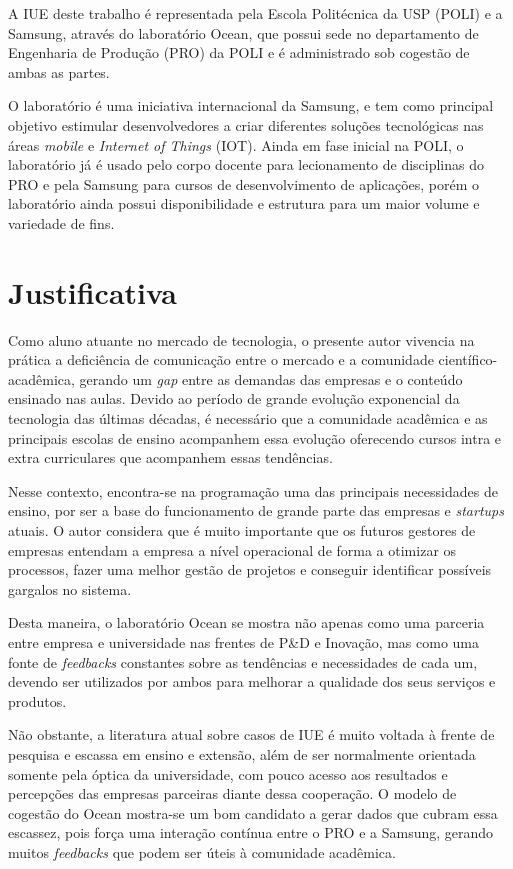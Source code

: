 A IUE deste trabalho é representada pela Escola Politécnica da USP (POLI) e a Samsung, através do laboratório Ocean, que possui sede no departamento de Engenharia de Produção (PRO) da POLI e é administrado sob cogestão de ambas as partes.

O laboratório é uma iniciativa internacional da Samsung, e tem como principal objetivo estimular desenvolvedores a criar diferentes soluções tecnológicas nas áreas \textit{mobile} e \textit{Internet of Things} (IOT). Ainda em fase inicial na POLI, o laboratório já é usado pelo corpo docente para lecionamento de disciplinas do PRO e pela Samsung para cursos de desenvolvimento de aplicações, porém o laboratório ainda possui disponibilidade e estrutura para um maior volume e variedade de fins.

\section{Justificativa}
\label{cha:justificativa}

Como aluno atuante no mercado de tecnologia, o presente autor vivencia na prática a deficiência de comunicação entre o mercado e a comunidade científico-acadêmica, gerando um \textit{gap} entre as demandas das empresas e o conteúdo ensinado nas aulas. Devido ao período de grande evolução exponencial da tecnologia das últimas décadas, é necessário que a comunidade acadêmica e as principais escolas de ensino acompanhem essa evolução oferecendo cursos intra e extra curriculares que acompanhem essas tendências.

Nesse contexto, encontra-se na programação uma das principais necessidades de ensino, por ser a base do funcionamento de grande parte das empresas e \textit{startups} atuais. O autor considera que é muito importante que os futuros gestores de empresas entendam a empresa a nível operacional de forma a otimizar os processos, fazer uma melhor gestão de projetos e conseguir identificar possíveis gargalos no sistema.

Desta maneira, o laboratório Ocean se mostra não apenas como uma parceria entre empresa e universidade nas frentes de  P\&D e Inovação, mas como uma fonte de \textit{feedbacks} constantes sobre as tendências e necessidades de cada um, devendo ser utilizados por ambos para melhorar a qualidade dos seus serviços e produtos.

Não obstante, a literatura atual sobre casos de IUE é muito voltada à frente de pesquisa e escassa em ensino e extensão, além de ser normalmente orientada somente pela óptica da universidade, com pouco acesso aos resultados e percepções das empresas parceiras diante dessa cooperação. O modelo de cogestão do Ocean mostra-se um bom candidato a gerar dados que cubram essa escassez, pois força uma interação contínua entre o PRO e a Samsung, gerando muitos \textit{feedbacks} que podem ser úteis à comunidade acadêmica. 

